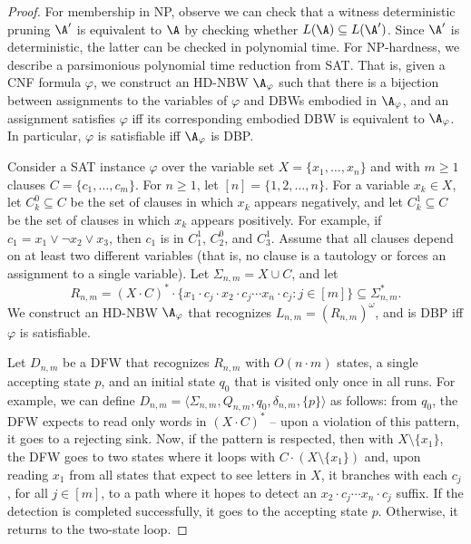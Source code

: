 \documentclass{lmcs}
\begin{document}
\begin{proof}
For membership in NP, observe we can check that a witness deterministic pruning $\A'$ is equivalent to $\A$ by checking whether $L(\A)\subseteq L(\A')$. Since $\A'$ is deterministic, the latter can be checked in polynomial time. For NP-hardness, we describe a parsimonious polynomial time reduction from SAT. That is, given a CNF formula $\varphi$, we construct an HD-NBW $\A_\varphi$ such that there is a bijection between assignments to the variables of $\varphi$ and DBWs embodied in $\A_\varphi$, and an assignment satisfies $\varphi$ iff its corresponding embodied DBW is equivalent to $\A_\varphi$. In particular, $\varphi$ is satisfiable iff $\A_\varphi$ is DBP. 

Consider a SAT instance $\varphi$ over the variable set $X=\{x_1,\ldots,x_n\}$ and with $m\geq 1$ clauses $C=\{c_1,\ldots,c_m\}$. For $n \geq 1$, let $[n]=\{1,2,\ldots,n\}$. 
	For a variable $x_k \in X$, let $C^0_k \subseteq C$ be the set of clauses in which $x_k$ appears negatively, and let $C^1_k \subseteq C$ be the set of clauses in which $x_k$ appears positively. For example, if $c_1=x_1\lor \lnot x_2 \lor x_3$, then $c_1$ is in $C^1_1$, $C_2^0$, and $C^1_3$.
		Assume that all clauses depend on at least two different variables (that is, no clause is a tautology or forces an assignment to a single variable). Let $\Sigma_{n,m} = X\cup C$, and let $$R_{n,m} = (X\cdot C)^*\cdot \{x_1\cdot c_j\cdot x_2\cdot c_j\cdots x_n\cdot c_j : j\in [m]\} \subseteq \Sigma^*_{n,m}.$$
	We construct an HD-NBW $\A_\varphi$ that recognizes $L_{n,m} = (R_{n,m})^\omega$, and is DBP iff $\varphi$ is satisfiable. 

	
	Let $D_{n,m}$ be a DFW that recognizes $R_{n,m}$ with $O(n \cdot m)$ states, a single accepting state $p$, and an initial state $q_0$ that is visited only once in all runs.  For example, we can define $D_{n,m}=\langle \Sigma_{n,m}, Q_{n,m}, q_0, \delta_{n,m}, \{p\}\rangle$ as follows: from $q_0$, the DFW expects to read only words in $(X \cdot C)^*$ -- upon a violation of this pattern, it goes to a rejecting sink. Now, if the pattern is respected, then with $X \setminus \{x_1\}$, the DFW goes to two states where it loops with $C \cdot (X \setminus \{x_1\})$ and, upon reading $x_1$ from all states that expect to see letters in $X$, it branches with each $c_j$, for all $j \in [m]$, to a path where it hopes to detect an $x_2\cdot c_j\cdots x_n\cdot c_j$ suffix. 
	If the detection is completed successfully, it goes to the accepting state $p$. Otherwise, it returns to the two-state loop.



\end{proof}
\end{document}
